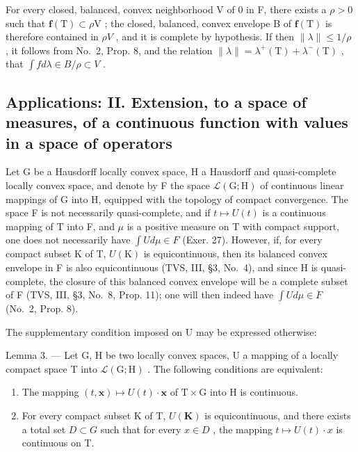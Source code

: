 For every closed, balanced, convex neighborhood V of 0 in F, there exists a \(\rho > 0\) such that \(\mathbf{f}(\mathrm{T}) \subset \rho\mathrm{V}\) ; the closed, balanced, convex envelope B of \(\mathbf{f}(\mathrm{T})\) is therefore contained in \(\rho V\) , and it is complete by hypothesis. If then \(\|\lambda\| \leqslant 1/\rho\) , it follows from No.~2, Prop. 8, and the relation \(\|\lambda\| = \lambda^{+}(\mathrm{T}) + \lambda^{-}(\mathrm{T})\) , that \(\int f d\lambda \in B/\rho \subset V\) .

\subsection{Applications: II. Extension, to a space of measures, of a continuous function with values in a space of operators}

Let G be a Hausdorff locally convex space, H a Hausdorff and quasi-complete locally convex space, and denote by F the space \(\mathcal{L}(\mathrm{G};\mathrm{H})\) of continuous linear mappings of G into H, equipped with the topology of compact convergence. The space F is not necessarily quasi-complete, and if \(t \mapsto U(t)\) is a continuous mapping of T into F, and \(\mu\) is a positive measure on T with compact support, one does not necessarily have \(\int U d\mu \in F\) (Exer. 27). However, if, for every compact subset K of T, \(U(\mathrm{K})\) is equicontinuous, then its balanced convex envelope in F is also equicontinuous (TVS, III, §3, No.~4), and since H is quasi-complete, the closure of this balanced convex envelope will be a complete subset of F (TVS, III, §3, No.~8, Prop. 11); one will then indeed have \(\int U d\mu \in F\) (No.~2, Prop. 8).

The supplementary condition imposed on U may be expressed otherwise:

Lemma 3. --- Let G, H be two locally convex spaces, U a mapping of a locally compact space T into \(\mathcal{L}(\mathrm{G};\mathrm{H})\) . The following conditions are equivalent:

\begin{enumerate}
\def\labelenumi{\alph{enumi})}
\item
  The mapping \((t,\mathbf{x})\mapsto U(t)\cdot \mathbf{x}\) of \(\mathrm{T}\times \mathrm{G}\) into H is continuous.
\item
  For every compact subset K of T, \(U(\mathbf{K})\) is equicontinuous, and there exists a total set \(D \subset G\) such that for every \(x \in D\) , the mapping \(t \mapsto U(t) \cdot x\) is continuous on T.
\end{enumerate}

